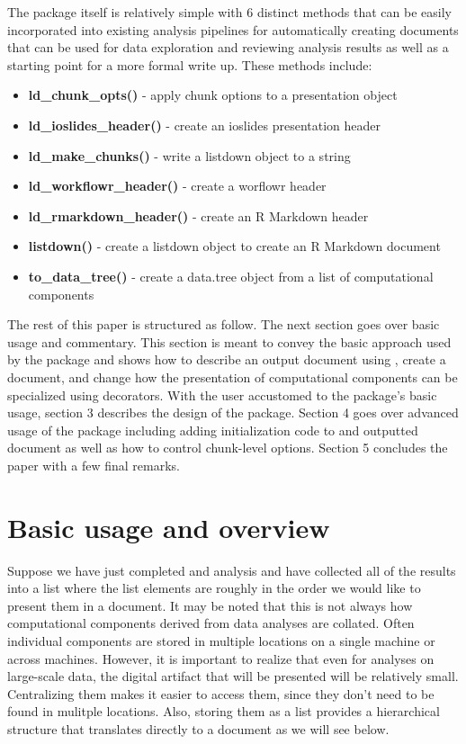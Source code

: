 The package itself is relatively simple with 6 distinct methods that can
be easily incorporated into existing analysis pipelines for
automatically creating documents that can be used for data exploration
and reviewing analysis results as well as a starting point for a more
formal write up. These methods include:

\begin{itemize}
\item{\bf ld\_chunk\_opts() }{- apply chunk options to a presentation object}
\item{\bf ld\_ioslides\_header() }{- create an ioslides presentation header}
\item{\bf ld\_make\_chunks() }{- write a listdown object to a string}
\item{\bf ld\_workflowr\_header() }{- create a worflowr header}
\item{\bf ld\_rmarkdown\_header() }{- create an R Markdown header}
\item{\bf listdown() }{- create a listdown object to create an R Markdown document}
\item{\bf to\_data\_tree() }{- create a data.tree object from a list of computational components}
\end{itemize}

The rest of this paper is structured as follow. The next section goes
over basic usage and commentary. This section is meant to convey the
basic approach used by the package and shows how to describe an output
document using , create a document, and change how the
presentation of computational components can be specialized using
 decorators. With the user accustomed to the package's
basic usage, section 3 describes the design of the package. Section 4
goes over advanced usage of the package including adding initialization
code to and outputted document as well as how to control chunk-level
options. Section 5 concludes the paper with a few final remarks.

\hypertarget{basic-usage-and-overview}{%
\section{Basic usage and overview}\label{basic-usage-and-overview}}

Suppose we have just completed and analysis and have collected all of
the results into a list where the list elements are roughly in the order
we would like to present them in a document. It may be noted that this
is not always how computational components derived from data analyses
are collated. Often individual components are stored in multiple
locations on a single machine or across machines. However, it is
important to realize that even for analyses on large-scale data, the
digital artifact that will be presented will be relatively small.
Centralizing them makes it easier to access them, since they don't need
to be found in mulitple locations. Also, storing them as a list provides
a hierarchical structure that translates directly to a document as we
will see below.

